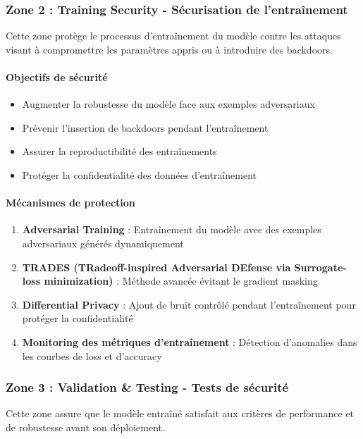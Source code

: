 \subsubsection{Zone 2 : Training Security - Sécurisation de l'entraînement}

Cette zone protège le processus d'entraînement du modèle contre les attaques visant à compromettre les paramètres appris ou à introduire des backdoors.

\paragraph{Objectifs de sécurité}
\begin{itemize}
    \item Augmenter la robustesse du modèle face aux exemples adversariaux
    \item Prévenir l'insertion de backdoors pendant l'entraînement
    \item Assurer la reproductibilité des entraînements
    \item Protéger la confidentialité des données d'entraînement
\end{itemize}

\paragraph{Mécanismes de protection}
\begin{enumerate}
    \item \textbf{Adversarial Training} : Entraînement du modèle avec des exemples adversariaux générés dynamiquement
    \item \textbf{TRADES (TRadeoff-inspired Adversarial DEfense via Surrogate-loss minimization)} : Méthode avancée évitant le gradient masking
    \item \textbf{Differential Privacy} : Ajout de bruit contrôlé pendant l'entraînement pour protéger la confidentialité
    \item \textbf{Monitoring des métriques d'entraînement} : Détection d'anomalies dans les courbes de loss et d'accuracy
\end{enumerate}

\subsubsection{Zone 3 : Validation \& Testing - Tests de sécurité}

Cette zone assure que le modèle entraîné satisfait aux critères de performance et de robustesse avant son déploiement.

